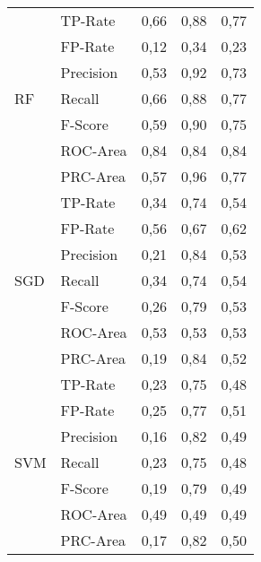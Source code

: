 \documentclass[master,twoside,extern,palatino]{rgseThesis}
\begin{document}
\begin{table}[ht]
{\begin{tabular}{|ll|rrr|}
\hline
\multirow{7}{*}{RF}  & TP-Rate   & 0,66             & 0,88                 & 0,77              \\
                     & FP-Rate   & 0,12             & 0,34                 & 0,23              \\
                     & Precision & 0,53             & 0,92                 & 0,73              \\
                     & Recall    & 0,66             & 0,88                 & 0,77              \\
                     & F-Score   & 0,59             & 0,90                 & 0,75              \\
                     & ROC-Area  & 0,84             & 0,84                 & 0,84              \\
                     & PRC-Area  & 0,57             & 0,96                 & 0,77              \\ 
\hline
\multirow{7}{*}{SGD} & TP-Rate   & 0,34             & 0,74                 & 0,54              \\
                     & FP-Rate   & 0,56             & 0,67                 & 0,62              \\
                     & Precision & 0,21             & 0,84                 & 0,53              \\
                     & Recall    & 0,34             & 0,74                 & 0,54              \\
                     & F-Score   & 0,26             & 0,79                 & 0,53              \\
                     & ROC-Area  & 0,53             & 0,53                 & 0,53              \\
                     & PRC-Area  & 0,19             & 0,84                 & 0,52              \\ 
\hline
\multirow{7}{*}{SVM} & TP-Rate   & 0,23             & 0,75                 & 0,48              \\
                     & FP-Rate   & 0,25             & 0,77                 & 0,51              \\
                     & Precision & 0,16             & 0,82                 & 0,49              \\
                     & Recall    & 0,23             & 0,75                 & 0,48              \\
                     & F-Score   & 0,19             & 0,79                 & 0,49              \\
                     & ROC-Area  & 0,49             & 0,49                 & 0,49              \\
                     & PRC-Area  & 0,17             & 0,82                 & 0,50              \\
\hline
\end{tabular}
}
\end{table}
\end{document}
